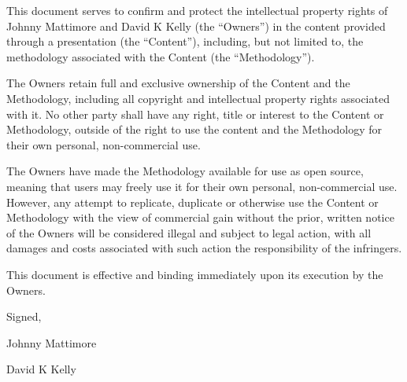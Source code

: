 \documentclass{article}
\begin{document}
\clearpage
\begin{appendices}

This document serves to confirm and protect the intellectual property rights of Johnny Mattimore and David K Kelly (the “Owners”) in the content provided through a presentation (the “Content”), including, but not limited to, the methodology associated with the Content (the “Methodology”).  \par

The Owners retain full and exclusive ownership of the Content and the Methodology,  including all copyright and intellectual property rights associated with it. No other party shall have any right,  title or interest to the Content or Methodology,  outside of the right to use the content and the Methodology for their own personal,  non-commercial use. \par

The Owners have made the Methodology available for use as open source,  meaning that users may freely use it for their own personal,  non-commercial use. However,  any attempt to replicate, duplicate or otherwise use the Content or Methodology with the view of commercial gain without the prior,  written notice of the Owners will be considered illegal and subject to legal action,  with all damages and costs associated with such action the responsibility of the infringers.  \par

This document is effective and binding immediately upon its execution by the Owners. \par

Signed,  \par

Johnny Mattimore \par
David K Kelly \par

\end{appendices}
\end{document}
